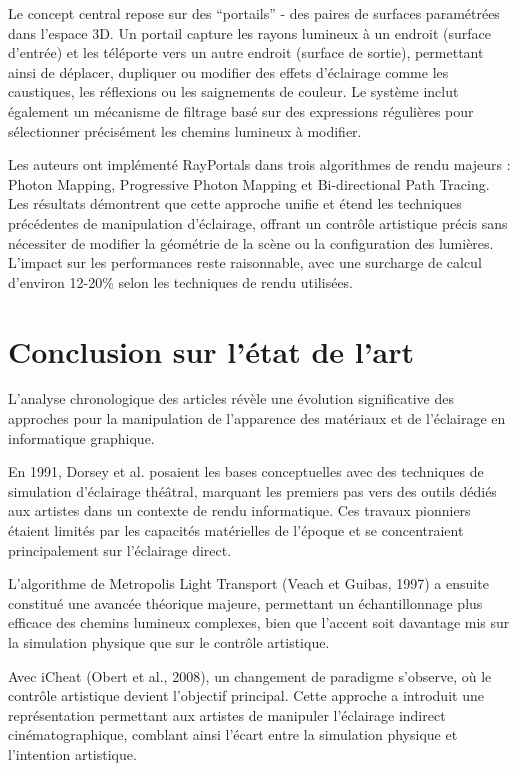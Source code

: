 \documentclass{article}
\begin{document}
Le concept central repose sur des ``portails'' - des paires de surfaces paramétrées dans l'espace 3D. Un portail capture les rayons lumineux à un endroit (surface d'entrée) et les téléporte vers un autre endroit (surface de sortie), permettant ainsi de déplacer, dupliquer ou modifier des effets d'éclairage comme les caustiques, les réflexions ou les saignements de couleur. Le système inclut également un mécanisme de filtrage basé sur des expressions régulières pour sélectionner précisément les chemins lumineux à modifier.

Les auteurs ont implémenté RayPortals dans trois algorithmes de rendu majeurs : Photon Mapping, Progressive Photon Mapping et Bi-directional Path Tracing. Les résultats démontrent que cette approche unifie et étend les techniques précédentes de manipulation d'éclairage, offrant un contrôle artistique précis sans nécessiter de modifier la géométrie de la scène ou la configuration des lumières. L'impact sur les performances reste raisonnable, avec une surcharge de calcul d'environ 12-20\% selon les techniques de rendu utilisées.

\newpage
\section{Conclusion sur l'état de l'art}

L'analyse chronologique des articles révèle une évolution significative des approches pour la manipulation de l'apparence des matériaux et de l'éclairage en informatique graphique.

En 1991, Dorsey et al. posaient les bases conceptuelles avec des techniques de simulation d'éclairage théâtral, marquant les premiers pas vers des outils dédiés aux artistes dans un contexte de rendu informatique. Ces travaux pionniers étaient limités par les capacités matérielles de l'époque et se concentraient principalement sur l'éclairage direct.

L'algorithme de Metropolis Light Transport (Veach et Guibas, 1997) a ensuite constitué une avancée théorique majeure, permettant un échantillonnage plus efficace des chemins lumineux complexes, bien que l'accent soit davantage mis sur la simulation physique que sur le contrôle artistique.

Avec iCheat (Obert et al., 2008), un changement de paradigme s'observe, où le contrôle artistique devient l'objectif principal. Cette approche a introduit une représentation permettant aux artistes de manipuler l'éclairage indirect cinématographique, comblant ainsi l'écart entre la simulation physique et l'intention artistique.
\end{document}
